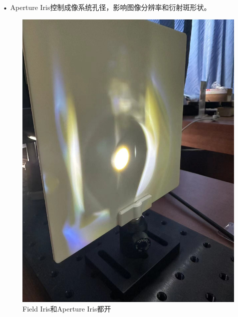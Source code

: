\documentclass{ctexart}
\begin{document}
• Aperture Iris控制成像系统孔径，影响图像分辨率和衍射斑形状。
\begin{figure}[H]
  \centering
  \begin{minipage}[b]{0.2\textwidth}
    \centering
    \includegraphics[width=\textwidth]{pictures/微信图片_20241010201015.jpg}
    \caption{Field Iris和Aperture Iris都开}
  \end{minipage}
  \hspace{0.05\textwidth} %
  \begin{minipage}[b]{0.2\textwidth}
    \centering

\end{minipage}
\end{figure}
\end{document}
